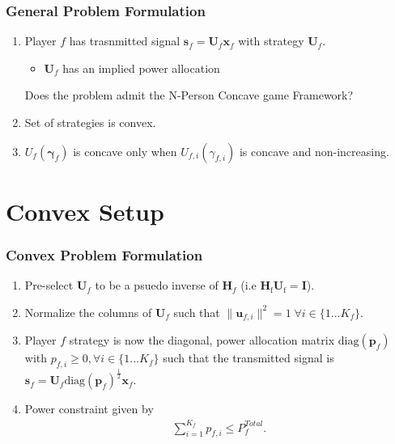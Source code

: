 \documentclass[10pt,tgadventor, onlymath]{beamer}
\begin{document}
\begin{frame}

\frametitle{General Problem Formulation}
\begin{enumerate}
\setlength\itemsep{2em}

\item  Player $f$ has trasnmitted signal $\mathbf{s}_{f
	}= \mathbf{U}_{f}\mathbf{x}_{f}$ with strategy $\mathbf{U}_f$.
\begin{itemize}
\item $\mathbf{U}_f$ has an implied power allocation
\end{itemize}
\pause
Does the problem admit the N-Person Concave game Framework? 

\item  Set of strategies is convex. \faThumbsOUp
\pause
\item  $U_{f}(\boldsymbol{\gamma}_{f})$ is concave only when $U_{f,i}(\gamma_{f,i})$ is concave and non-increasing.
\faThumbsODown
\end{enumerate}
\end{frame}

\section{Convex Setup}

\begin{frame}
\frametitle{Convex Problem Formulation}
\begin{enumerate}
\setlength\itemsep{2em}
\item Pre-select $\mathbf{U}_f$ to be a psuedo inverse of $\mathbf{H}_f$  (i.e $\mathbf{H}_\mathrm{f}\mathbf{U}_\mathrm{f} = \mathbf{I}$).
\item 
	Normalize the columns of $\mathbf{U}_{f}$ such that 
	 $\|\mathbf{u}_{f,i}\|^2 =1 \;\forall i \in \{1 ... K_{f}\}$.
\item 
	Player $f$ strategy is now the diagonal, power allocation  	
	matrix $\mathrm{diag}(\mathbf{p}_{f})$ with $p_{f,i} \geq 0, \forall i \in \{1 ... K_{f}\}$
such that the transmitted 		
	signal is 
	$\mathbf{s}_{f	}= \mathbf{U}_{f} 
	\mathrm{diag}(\mathbf{p}_{f})^{\frac{1}{2}}
	\mathbf{x}_{f}$.
\item 
	Power constraint given by 
	\begin{gather*}
	\sum_{i=1}^{K_{f}} p_{f,i}
	  \leq P^{Total}_{f}.
	  	\end{gather*}
\end{enumerate}
\end{frame}
\end{document}
